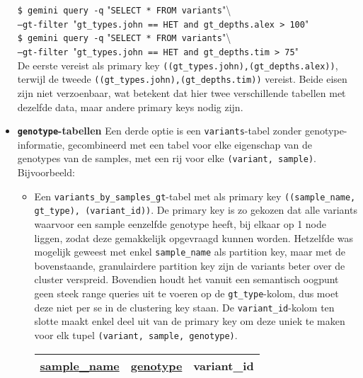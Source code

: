 \begin{itemize}
\noindent\texttt{\$ gemini query -q} "\texttt{SELECT * FROM variants}"\textbackslash \\\texttt{--gt-filter }"\texttt{gt\_types.john == HET and gt\_depths.alex > 100}"\\

\noindent\texttt{\$ gemini query -q} "\texttt{SELECT * FROM variants}"\textbackslash \\\texttt{--gt-filter }"\texttt{gt\_types.john == HET and gt\_depths.tim > 75}"\\

De eerste vereist als primary key \texttt{((gt\_types.john),(gt\_depths.alex))}, terwijl de tweede \texttt{((gt\_types.john),(gt\_depths.tim))} vereist. Beide eisen zijn niet verzoenbaar, wat betekent dat hier twee verschillende tabellen met dezelfde data, maar andere primary keys nodig zijn.

\item \textbf{\texttt{genotype}-tabellen} Een derde optie is een \texttt{variants}-tabel zonder genotype-informatie, gecombineerd met een tabel voor elke eigenschap van de genotypes van de samples, met een rij voor elke \texttt{(variant, sample)}. Bijvoorbeeld:\\

\begin{itemize}

\item Een \texttt{variants\_by\_samples\_gt}-tabel met als primary key \texttt{((sample\_name, gt\_type), (variant\_id))}. De primary key is zo gekozen dat alle variants waarvoor een sample eenzelfde genotype heeft, bij elkaar op 1 node liggen, zodat deze gemakkelijk opgevraagd kunnen worden. Hetzelfde was mogelijk geweest met enkel \texttt{sample\_name} als partition key, maar met de bovenstaande, granulairdere partition key zijn de variants beter over de cluster verspreid. Bovendien houdt het vanuit een semantisch oogpunt geen steek range queries uit te voeren op de \texttt{gt\_type}-kolom, dus moet deze niet per se in de clustering key staan. De \texttt{variant\_id}-kolom ten slotte maakt enkel deel uit van de primary key om deze uniek te maken voor elk tupel \texttt{(variant, sample, genotype)}.\\

\begin{table}[!htbp]
\begin{tabular}{@{}|l|l|l|@{}}
\toprule
\color{ForestGreen} \underline{sample\_name} & \color{ForestGreen} \underline{genotype} & \color{red} variant\_id \\ \bottomrule
\end{tabular}\\
\end{table}


\end{itemize}
\end{itemize}
